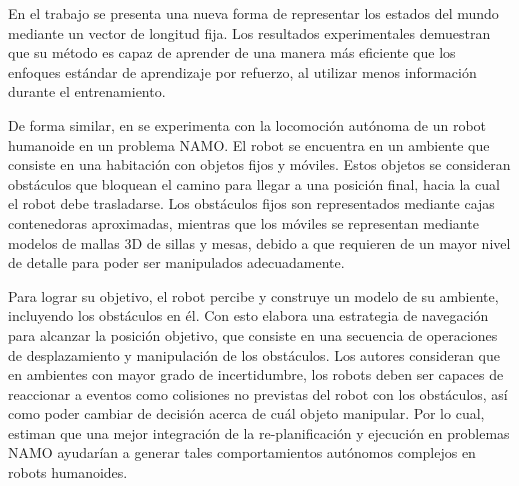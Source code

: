 En el trabajo se presenta una nueva forma de representar los estados del mundo mediante un vector de longitud fija.
Los resultados experimentales demuestran que su método es capaz de aprender de una manera más eficiente que los enfoques estándar de aprendizaje por refuerzo, al utilizar menos información durante el entrenamiento.

De forma similar, en \cite{doi:10.1163/156855307782227408} se experimenta con la locomoción autónoma de un robot humanoide en un problema NAMO.
El robot se encuentra en un ambiente que consiste en una habitación con objetos fijos y móviles.
Estos objetos se consideran obstáculos que bloquean el camino para llegar a una posición final, hacia la cual el robot debe trasladarse.
Los obstáculos fijos son representados mediante cajas contenedoras aproximadas, mientras que los móviles se representan mediante modelos de mallas 3D de sillas y mesas, debido a que requieren de un mayor nivel de detalle para poder ser manipulados adecuadamente.

Para lograr su objetivo, el robot percibe y construye un modelo de su ambiente, incluyendo los obstáculos en él.
Con esto elabora una estrategia de navegación para alcanzar la posición objetivo, que consiste en una secuencia de operaciones de desplazamiento y manipulación de los obstáculos.
Los autores consideran que en ambientes con mayor grado de incertidumbre, los robots deben ser capaces de reaccionar a eventos como colisiones no previstas del robot con los obstáculos, así como poder cambiar de decisión acerca de cuál objeto manipular.
Por lo cual, estiman que una mejor integración de la re-planificación y ejecución en problemas NAMO ayudarían a generar tales comportamientos autónomos complejos en robots humanoides.

